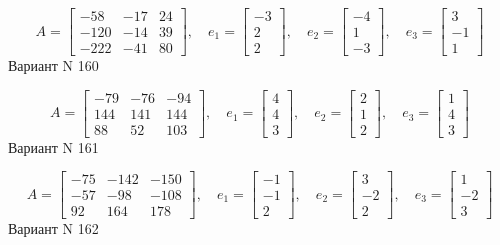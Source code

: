 \documentclass[11pt]{report}
\begin{document}
$$A = \left[\begin{matrix}-58 & -17 & 24\\-120 & -14 & 39\\-222 & -41 & 80\end{matrix}\right],\quad e_1 = \left[\begin{matrix}-3\\2\\2\end{matrix}\right],\quad e_2 = \left[\begin{matrix}-4\\1\\-3\end{matrix}\right],\quad e_3 = \left[\begin{matrix}3\\-1\\1\end{matrix}\right]$$Вариант N 160

$$A = \left[\begin{matrix}-79 & -76 & -94\\144 & 141 & 144\\88 & 52 & 103\end{matrix}\right],\quad e_1 = \left[\begin{matrix}4\\4\\3\end{matrix}\right],\quad e_2 = \left[\begin{matrix}2\\1\\2\end{matrix}\right],\quad e_3 = \left[\begin{matrix}1\\4\\3\end{matrix}\right]$$Вариант N 161

$$A = \left[\begin{matrix}-75 & -142 & -150\\-57 & -98 & -108\\92 & 164 & 178\end{matrix}\right],\quad e_1 = \left[\begin{matrix}-1\\-1\\2\end{matrix}\right],\quad e_2 = \left[\begin{matrix}3\\-2\\2\end{matrix}\right],\quad e_3 = \left[\begin{matrix}1\\-2\\3\end{matrix}\right]$$Вариант N 162
\end{document}

